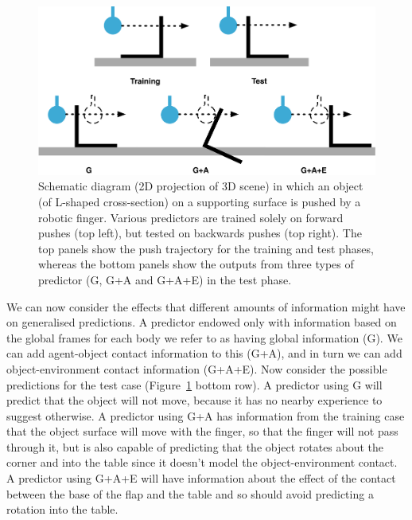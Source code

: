 \begin{figure}[b]
\centerline{\includegraphics[width=0.9\columnwidth]{BackPushToyExample}}
\caption[ToyExample]{Schematic diagram (2D projection of 3D scene)
in which an object (of L-shaped cross-section) on a supporting surface
is pushed by a robotic finger. 
Various predictors are trained solely on forward pushes (top left), but tested on backwards pushes (top right). The top panels show the push trajectory for the training and test phases, whereas the bottom panels show the outputs from three types of predictor (G, G+A and G+A+E) in the test phase.}
\label{fig:ToyExample}
\end{figure}

We can now consider the effects that different amounts of information
might have on generalised predictions. A predictor endowed only with
information based on the global frames for each body we refer to as
having global information (G). We can add agent-object contact
information to this (G+A), and in turn we can add object-environment
contact information (G+A+E). Now consider the possible predictions for
the test case (Figure~\ref{fig:ToyExample} bottom row). A predictor
using G will predict that the object will not move, because it has no
nearby experience to suggest otherwise. A predictor using G+A has
information from the training case that the object surface will move
with the finger, so that the finger will not pass through it, but is
also capable of predicting that the object rotates about the corner
and into the table since it doesn't model the object-environment
contact. A predictor using G+A+E will have information about the
effect of the contact between the base of the flap and the table and
so should avoid predicting a rotation into the table.

